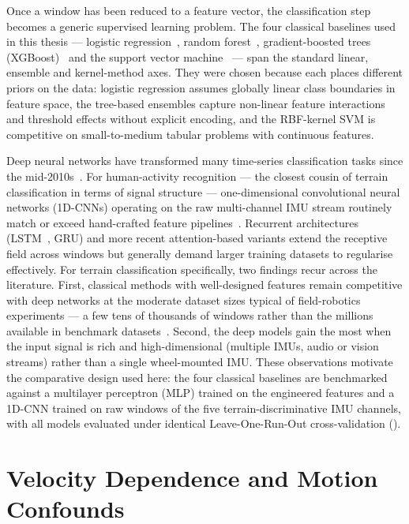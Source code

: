 Once a window has been reduced to a feature vector, the classification step becomes a generic supervised learning problem. The four classical baselines used in this thesis --- logistic regression~\cite{Hosmer2013}, random forest~\cite{Breiman2001}, gradient-boosted trees (XGBoost)~\cite{Chen2016} and the support vector machine~\cite{Cortes1995} --- span the standard linear, ensemble and kernel-method axes. They were chosen because each places different priors on the data: logistic regression assumes globally linear class boundaries in feature space, the tree-based ensembles capture non-linear feature interactions and threshold effects without explicit encoding, and the RBF-kernel SVM is competitive on small-to-medium tabular problems with continuous features.

Deep neural networks have transformed many time-series classification tasks since the mid-2010s~\cite{LeCun2015,Fawaz2019}. For human-activity recognition --- the closest cousin of terrain classification in terms of signal structure --- one-dimensional convolutional neural networks (1D-CNNs) operating on the raw multi-channel IMU stream routinely match or exceed hand-crafted feature pipelines~\cite{Wang2017,Fawaz2019}. Recurrent architectures (LSTM~\cite{Hochreiter1997}, GRU) and more recent attention-based variants extend the receptive field across windows but generally demand larger training datasets to regularise effectively. For terrain classification specifically, two findings recur across the literature. First, classical methods with well-designed features remain competitive with deep networks at the moderate dataset sizes typical of field-robotics experiments --- a few tens of thousands of windows rather than the millions available in benchmark datasets~\cite{Weiss2011,Otsu2016,Fawaz2019}. Second, the deep models gain the most when the input signal is rich and high-dimensional (multiple IMUs, audio or vision streams) rather than a single wheel-mounted IMU. These observations motivate the comparative design used here: the four classical baselines are benchmarked against a multilayer perceptron (MLP) trained on the engineered features and a 1D-CNN trained on raw windows of the five terrain-discriminative IMU channels, with all models evaluated under identical Leave-One-Run-Out cross-validation ().

\section{Velocity Dependence and Motion Confounds}
\label{sec:bg-vel}

